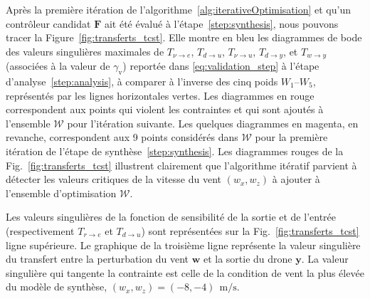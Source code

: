 Après la première itération de l'algorithme~\ref{alg:iterativeOptimisation} et qu'un contrôleur candidat $\boldsymbol{F}$ ait été évalué à l'étape~\ref{step:synthesis}, nous pouvons tracer la Figure~\ref{fig:transferts_tcst}. Elle montre en bleu les diagrammes de bode des valeurs singulières maximales de $T_{\nu \rightarrow e}$, $T_{d \rightarrow u}$, $T_{\nu \rightarrow u}$, $T_{d \rightarrow y}$, et $T_{w \rightarrow y}$ (associées à la valeur de $\gamma_{\text{v}}$) reportée dans \eqref{eq:validation_step} à l'étape d'analyse~\ref{step:analysis}, à comparer à l'inverse des cinq poids $W_1$--$W_5$, représentés par les lignes horizontales vertes. 
Les diagrammes en rouge correspondent aux points qui violent les contraintes et qui sont ajoutés à l'ensemble ${\mathcal W}$ pour l'itération suivante. Les quelques diagrammes en magenta, en revanche, correspondent aux 9 points considérés dans ${\mathcal W}$ pour la première itération de l'étape de synthèse~\ref{step:synthesis}.
Les diagrammes rouges de la Fig.~\ref{fig:transferts_tcst} illustrent clairement que l'algorithme itératif parvient à détecter les valeurs critiques de la vitesse du vent $(w_x,w_z)$ à ajouter à l'ensemble d'optimisation ${\mathcal W}$.

Les valeurs singulières de la fonction de sensibilité de la sortie et de l'entrée (respectivement $T_{r \rightarrow e}$ et $T_{d \rightarrow u}$) sont représentées sur la Fig.~\ref{fig:transferts_tcst} ligne supérieure. Le graphique de la troisième ligne représente la valeur singulière du transfert entre la perturbation du vent $\boldsymbol{w}$ et la sortie du drone $\boldsymbol{y}$. La valeur singulière qui tangente la contrainte est celle de la condition de vent la plus élevée du modèle de synthèse, $(w_x, w_z) = (-8,-4)~\SI{}{\meter\per\second}$.



